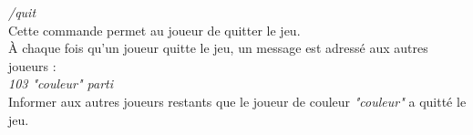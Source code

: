 
\par
\textit{/quit} \\
Cette commande permet au joueur de quitter le jeu. \\

À chaque fois qu'un joueur quitte le jeu, un message est adressé aux autres joueurs : \\

\textit{103 "couleur" parti} \\
Informer aux autres joueurs restants que le joueur de couleur \textit{"couleur"} a quitté le jeu.
\\